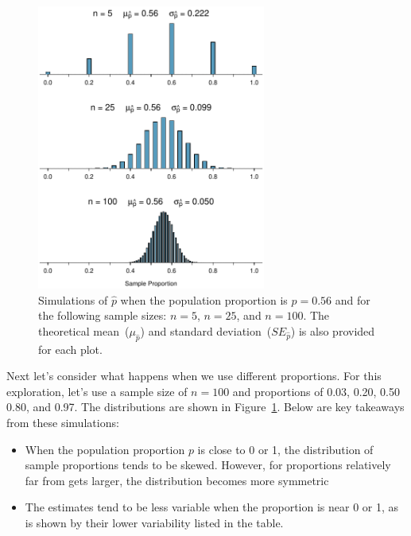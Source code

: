 \begin{figure}
   \centering
   \includegraphics[width=0.67\textwidth]{ch_inference_for_props/figures/sampling_X_prop_56p/sampling_X_prop_56p}
   \caption{Simulations of $\hat{p}$ when the population
       proportion is $p = 0.56$ and for the following sample sizes:
       $n = 5$, $n = 25$, and $n = 100$. The theoretical
       mean~($\mu_{\hat{p}}$) and standard
       deviation~($SE_{\hat{p}}$) is also provided for each plot.}
   \label{sampling_X_prop_56p}
\end{figure}


Next let's consider what happens when we use different proportions.
For this exploration, let's use a sample size of $n = 100$ and
proportions of 0.03, 0.20, 0.50 0.80, and 0.97. The distributions
are shown in Figure~\ref{sampling_X_prop_56p}. Below are key
takeaways from these simulations:
\begin{itemize}
\item When the population proportion $p$ is close to 0 or 1, the
    distribution of sample proportions tends to be skewed. However,
    for proportions relatively far from   gets larger, the
    distribution becomes more symmetric
\item The estimates tend to be less variable when the proportion
    is near 0 or 1, as is shown by their lower variability listed
    in the table.
\end{itemize}


